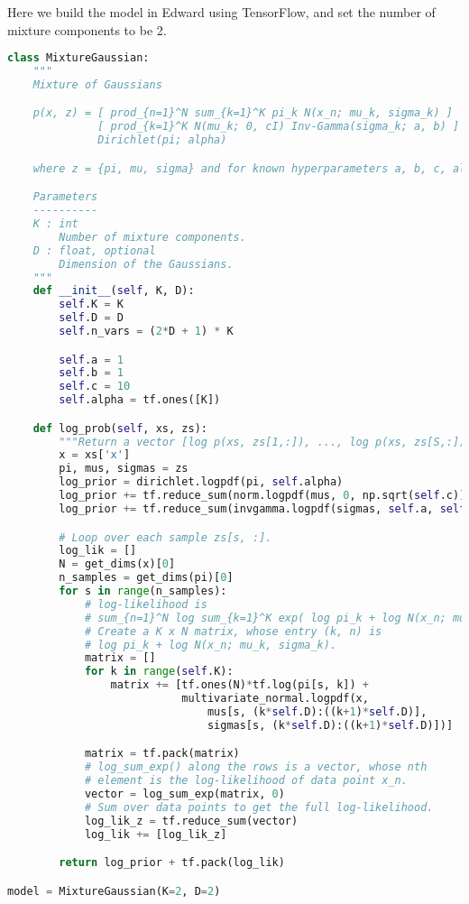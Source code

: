 Here we build the model in Edward using TensorFlow, and set the number
of mixture components to be 2.
\begin{lstlisting}[language=Python]
class MixtureGaussian:
    """
    Mixture of Gaussians

    p(x, z) = [ prod_{n=1}^N sum_{k=1}^K pi_k N(x_n; mu_k, sigma_k) ]
              [ prod_{k=1}^K N(mu_k; 0, cI) Inv-Gamma(sigma_k; a, b) ]
              Dirichlet(pi; alpha)

    where z = {pi, mu, sigma} and for known hyperparameters a, b, c, alpha.

    Parameters
    ----------
    K : int
        Number of mixture components.
    D : float, optional
        Dimension of the Gaussians.
    """
    def __init__(self, K, D):
        self.K = K
        self.D = D
        self.n_vars = (2*D + 1) * K

        self.a = 1
        self.b = 1
        self.c = 10
        self.alpha = tf.ones([K])

    def log_prob(self, xs, zs):
        """Return a vector [log p(xs, zs[1,:]), ..., log p(xs, zs[S,:])]."""
        x = xs['x']
        pi, mus, sigmas = zs
        log_prior = dirichlet.logpdf(pi, self.alpha)
        log_prior += tf.reduce_sum(norm.logpdf(mus, 0, np.sqrt(self.c)), 1)
        log_prior += tf.reduce_sum(invgamma.logpdf(sigmas, self.a, self.b), 1)

        # Loop over each sample zs[s, :].
        log_lik = []
        N = get_dims(x)[0]
        n_samples = get_dims(pi)[0]
        for s in range(n_samples):
            # log-likelihood is
            # sum_{n=1}^N log sum_{k=1}^K exp( log pi_k + log N(x_n; mu_k, sigma_k) )
            # Create a K x N matrix, whose entry (k, n) is
            # log pi_k + log N(x_n; mu_k, sigma_k).
            matrix = []
            for k in range(self.K):
                matrix += [tf.ones(N)*tf.log(pi[s, k]) +
                           multivariate_normal.logpdf(x,
                               mus[s, (k*self.D):((k+1)*self.D)],
                               sigmas[s, (k*self.D):((k+1)*self.D)])]

            matrix = tf.pack(matrix)
            # log_sum_exp() along the rows is a vector, whose nth
            # element is the log-likelihood of data point x_n.
            vector = log_sum_exp(matrix, 0)
            # Sum over data points to get the full log-likelihood.
            log_lik_z = tf.reduce_sum(vector)
            log_lik += [log_lik_z]

        return log_prior + tf.pack(log_lik)

model = MixtureGaussian(K=2, D=2)
\end{lstlisting}


